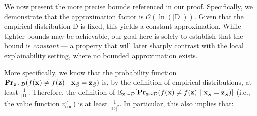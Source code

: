 \documentclass{article}
\newcommand{\z}{\textbf{z}}
\newcommand{\x}{\textbf{x}}
\begin{document}


We now present the more precise bounds referenced in our proof. Specifically, we demonstrate that the approximation factor is $\mathcal{O}(\ln(|\text{D}|))$. Given that the empirical distribution $\text{D}$ is fixed, this yields a constant approximation. While tighter bounds may be achievable, our goal here is solely to establish that the bound is \emph{constant} --- a property that will later sharply contrast with the local explainability setting, where no bounded approximation exists.




More specifically, we know that the probability function $\textbf{Pr}_{\z\sim\mathcal{D}}(f(\x)\neq f(\z) \ | \ \x_{\Bar{S}}=\z_{\Bar{S}})$ is, by the definition of empirical distributions, at least $\frac{1}{|\text{D}|}$. Therefore, the definition of $\mathbb{E}_{\x\sim\mathcal{D}}[
\textbf{Pr}_{\z\sim\mathcal{D}}(f(\x)\neq f(\z) \ | \ \x_{\Bar{S}}=\z_{\Bar{S}})]$ (i.e., the value function $v^g_{\text{con}}$) is at least $\frac{1}{|\text{D}|^2}$. In particular, this also implies that:


\end{document}
